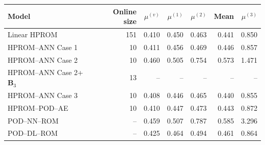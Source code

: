 \begin{tabular}{lr|rrrr|r}
\toprule
Model & Online size & $\mu^{(v)}$ & $\mu^{(1)}$ & $\mu^{(2)}$ & Mean & $\mu^{(3)}$ \\
\midrule
Linear HPROM & 151 & 0.410 & 0.450 & 0.463 & 0.441 & 0.850 \\
HPROM--ANN Case 1 & 10 & 0.411 & 0.456 & 0.469 & 0.446 & 0.857 \\
HPROM--ANN Case 2 & 10 & 0.460 & 0.505 & 0.754 & 0.573 & 1.471 \\
HPROM--ANN Case 2+$\mathbf B_3$ & 13 & -- & -- & -- & -- & -- \\
HPROM--ANN Case 3 & 10 & 0.408 & 0.446 & 0.465 & 0.440 & 0.855 \\
HPROM--POD--AE & 10 & 0.410 & 0.447 & 0.473 & 0.443 & 0.872 \\
\midrule
POD--NN--ROM & -- & 0.459 & 0.507 & 0.787 & 0.585 & 3.296 \\
POD--DL--ROM & -- & 0.425 & 0.464 & 0.494 & 0.461 & 0.864 \\
\bottomrule
\end{tabular}
